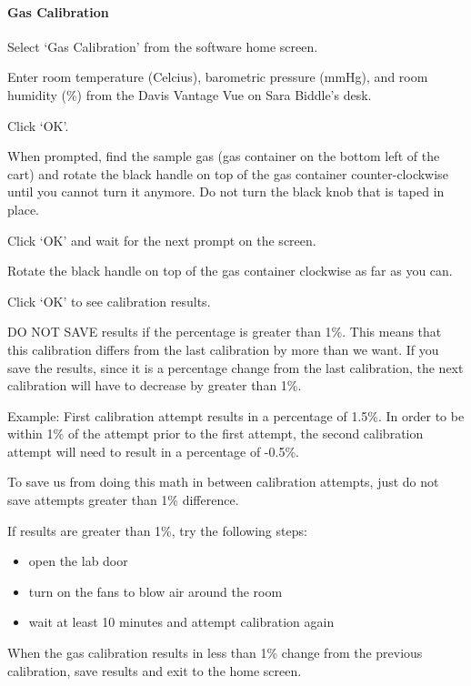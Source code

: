 \documentclass[
]{book}
\providecommand{\tightlist}{%
  \setlength{\itemsep}{0pt}\setlength{\parskip}{0pt}}
\begin{document}
\hypertarget{Appendix-Instruments-Parvo-Usage-Calibration-Gas}{%
\paragraph{Gas Calibration}\label{Appendix-Instruments-Parvo-Usage-Calibration-Gas}}

Select `Gas Calibration' from the software home screen.

Enter room temperature (Celcius), barometric pressure (mmHg), and room humidity (\%) from the Davis Vantage Vue on Sara Biddle's desk.

Click `OK'.

When prompted, find the sample gas (gas container on the bottom left of the cart) and rotate the black handle on top of the gas container counter-clockwise until you cannot turn it anymore. Do not turn the black knob that is taped in place.

Click `OK' and wait for the next prompt on the screen.

Rotate the black handle on top of the gas container clockwise as far as you can.

Click `OK' to see calibration results.

DO NOT SAVE results if the percentage is greater than 1\%. This means that this calibration differs from the last calibration by more than we want. If you save the results, since it is a percentage change from the last calibration, the next calibration will have to decrease by greater than 1\%.

Example: First calibration attempt results in a percentage of 1.5\%. In order to be within 1\% of the attempt prior to the first attempt, the second calibration attempt will need to result in a percentage of -0.5\%.

To save us from doing this math in between calibration attempts, just do not save attempts greater than 1\% difference.

If results are greater than 1\%, try the following steps:

\begin{itemize}
\tightlist
\item
  open the lab door
\item
  turn on the fans to blow air around the room
\item
  wait at least 10 minutes and attempt calibration again
\end{itemize}

When the gas calibration results in less than 1\% change from the previous calibration, save results and exit to the home screen.
\end{document}
